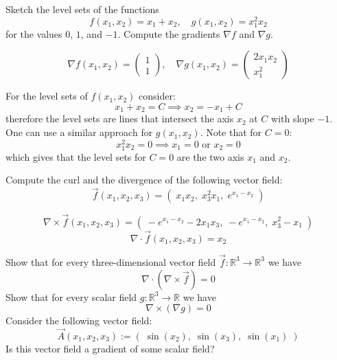 \documentclass[11pt]{article}
\begin{document}
\def\hidesolutions{}


\begin{exercise}
	Sketch the level sets of the functions 
    \[
        f(x_1,x_2) = x_1 + x_2, \quad g(x_1,x_2) = x_1^2 x_2 
    \]
    for the values $0$, $1$, and $-1$.
    Compute the gradients $\nabla f$ and  $\nabla g$.
\end{exercise}

\begin{solution}
    \[
        \nabla f(x_1,x_2) = \begin{pmatrix} 1\\ 1 \end{pmatrix}, \quad \nabla g(x_1,x_2) =  \begin{pmatrix} 2x_1x_2\\ x_1^2 \end{pmatrix}
    \]


For the level sets of $f(x_1,x_2)$ consider:
    \[
        x_1 + x_2 = C \implies x_2 = -x_1 + C
    \]
therefore the level sets are lines that intersect the axis $x_2$ at $C$ with slope $-1$. One can use a similar approach for $g(x_1,x_2)$. Note that for $C =0$:
    \[
        x_1^2 x_2 = 0 \implies x_1 =0 \text{ or } x_2 = 0
    \]
which gives that the level sets for $C = 0$ are the two axis $x_1$ and $x_2$. 
\end{solution}


\begin{exercise}
	Compute the curl and the divergence of the following vector field:
    \[
        \vec{f}(x_1,x_2,x_3) = \left( \; x_1 x_2, \; x_3^2 x_1,\;  e^{x_1 - x_2} \; \right)
    \]
\end{exercise}

\begin{solution}
    \[
        \nabla \times \vec{f}(x_1,x_2,x_3) = \left( \; -e^{x_1-x_2} - 2x_1x_3, \; -e^{x_1-x_2},\;  x_3^2 - x_1 \; \right)
    \]
   \[
        \nabla \cdot \vec{f}(x_1,x_2,x_3) = x_2
    \]
\end{solution}





\begin{exercise}
	Show that for every three-dimensional vector field $\vec{f} \colon \mathbb{R}^3 \to \mathbb{R}^3$ we have 
    \[
        \nabla \cdot \left( \nabla \times \vec{f} \right) = 0
    \]
    Show that for every scalar field $g \colon \mathbb{R}^3 \to \mathbb{R}$ we have 
    \[
        \nabla \times \left( \nabla g \right) = 0
    \]
    Consider the following vector field:
    \[
        \vec{A}(x_1,x_2,x_3) := \left( \; \sin(x_2),  \; \sin(x_3), \; \sin(x_1) \; \right)
    \]
    Is this vector field a gradient of some scalar field?
\end{exercise}
\end{document}
